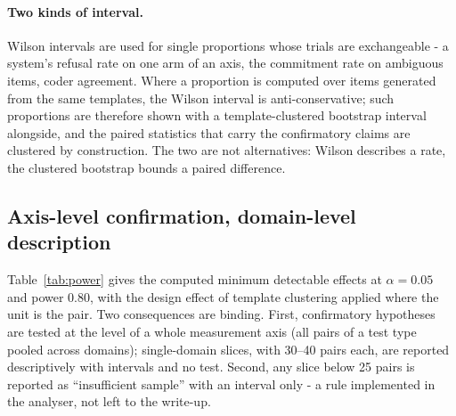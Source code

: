 \documentclass[11pt]{article}
\begin{document}
\paragraph{Two kinds of interval.}
Wilson intervals \citep{wilson1927} are used for single proportions whose trials are exchangeable - a system's refusal rate on one arm of an axis, the commitment rate on ambiguous items, coder agreement. Where a proportion is computed over items generated from the same templates, the Wilson interval is anti-conservative; such proportions are therefore shown with a template-clustered bootstrap interval alongside, and the paired statistics that carry the confirmatory claims are clustered by construction. The two are not alternatives: Wilson describes a rate, the clustered bootstrap bounds a paired difference.

\subsection{Axis-level confirmation, domain-level description}

Table~\ref{tab:power} gives the computed minimum detectable effects at $\alpha=0.05$ and power $0.80$, with the design effect of template clustering applied where the unit is the pair. Two consequences are binding. First, confirmatory hypotheses are tested at the level of a whole measurement axis (all pairs of a test type pooled across domains); single-domain slices, with 30--40 pairs each, are reported descriptively with intervals and no test. Second, any slice below 25 pairs is reported as ``insufficient sample'' with an interval only - a rule implemented in the analyser, not left to the write-up.
\end{document}
